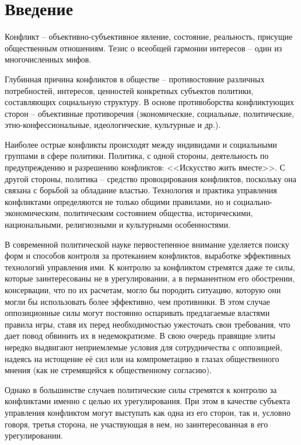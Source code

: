 \chapter*{Введение}

Конфликт -- объективно-субъективное явление, состояние, реальность, присущие
общественным отношениям. Тезис о всеобщей гармонии интересов -- один из
многочисленных мифов.

Глубинная причина конфликтов в обществе -- противостояние различных
потребностей, интересов, ценностей конкретных субъектов политики, составляющих
социальную структуру. В основе противоборства конфликтующих сторон -- %
объективные противоречия (экономические, социальные, политические,
этно-конфессиональные, идеологические, культурные и др.).

Наиболее острые конфликты происходят между индивидами и социальными группами в
сфере политики. Политика, с одной стороны, деятельность по предупреждению и
разрешению конфликтов: <<Искусство жить вместе>>. С другой стороны,
политика -- средство провоцирования конфликтов, поскольку она связана с борьбой
за обладание властью. Технология и практика управления конфликтами определяются
не только общими правилами, но и социально-экономическим, политическим
состоянием общества, историческими, национальными, религиозными и культурными
особенностями.

В современной политической науке первостепенное внимание уделяется поиску форм
и способов контроля за протеканием конфликтов, выработке эффективных технологий
управления ими. К контролю за конфликтом стремятся даже те силы, которые
заинтересованы не в урегулировании, а в перманентном его обострении,
консервации, что по их расчетам, могло бы породить ситуацию, которую они могли
бы использовать более эффективно, чем противники. В этом случае оппозиционные
силы могут постоянно оспаривать предлагаемые властями правила игры, ставя их
перед необходимостью ужесточать свои требования, что дает повод обвинить их в
недемократизме. В свою очередь правящие элиты нередко выдвигают неприемлемые
условия для сотрудничества с оппозицией, надеясь на истощение её сил или на
компрометацию в глазах общественного мнения (как не стремящейся к общественному
согласию).

Однако в большинстве случаев политические силы стремятся к контролю за
конфликтами именно с целью их урегулирования. При этом в качестве субъекта
управления конфликтом могут выступать как одна из его сторон, так и, условно
говоря, третья сторона, не участвующая в нем, но заинтересованная в его
урегулировании.

